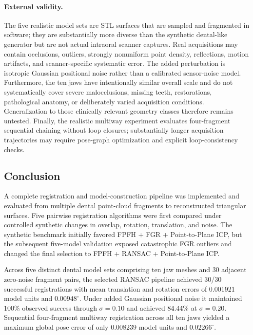 \paragraph{External validity.}
The five realistic model sets are STL surfaces that are sampled and fragmented in software; they are substantially more diverse than the synthetic dental-like generator but are not actual intraoral scanner captures. Real acquisitions may contain occlusions, outliers, strongly nonuniform point density, reflections, motion artifacts, and scanner-specific systematic error. The added perturbation is isotropic Gaussian positional noise rather than a calibrated sensor-noise model. Furthermore, the ten jaws have intentionally similar overall scale and do not systematically cover severe malocclusions, missing teeth, restorations, pathological anatomy, or deliberately varied acquisition conditions. Generalization to those clinically relevant geometry classes therefore remains untested. Finally, the realistic multiway experiment evaluates four-fragment sequential chaining without loop closures; substantially longer acquisition trajectories may require pose-graph optimization and explicit loop-consistency checks.

\FloatBarrier
\subsection{Conclusion}
\label{sec:marvin-conclusion}

A complete registration and model-construction pipeline was implemented and evaluated from multiple dental point-cloud fragments to reconstructed triangular surfaces. Five pairwise registration algorithms were first compared under controlled synthetic changes in overlap, rotation, translation, and noise. The synthetic benchmark initially favored FPFH + FGR + Point-to-Plane ICP, but the subsequent five-model validation exposed catastrophic FGR outliers and changed the final selection to FPFH + RANSAC + Point-to-Plane ICP.

Across five distinct dental model sets comprising ten jaw meshes and 30 adjacent zero-noise fragment pairs, the selected RANSAC pipeline achieved 30/30 successful registrations with mean translation and rotation errors of 0.001921 model units and $0.00948^\circ$. Under added Gaussian positional noise it maintained 100\% observed success through $\sigma=0.10$ and achieved 84.44\% at $\sigma=0.20$. Sequential four-fragment multiway registration across all ten jaws yielded a maximum global pose error of only 0.008239 model units and $0.02266^\circ$.

